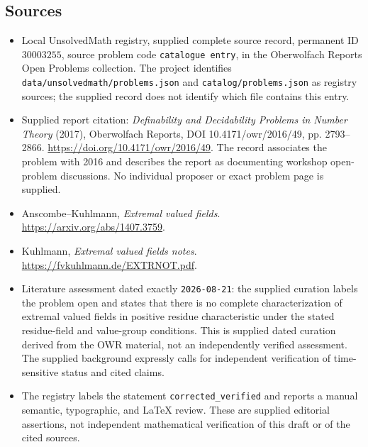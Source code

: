 \documentclass[11pt]{article}
\begin{document}
\subsection{Sources}
\begin{itemize}
\item Local UnsolvedMath registry, supplied complete source record, permanent ID \(30003255\), source problem code \texttt{catalogue entry}, in the Oberwolfach Reports Open Problems collection. The project identifies \texttt{data/unsolvedmath/problems.json} and \texttt{catalog/problems.json} as registry sources; the supplied record does not identify which file contains this entry.
\item Supplied report citation: \emph{Definability and Decidability Problems in Number Theory} (2017), Oberwolfach Reports, DOI 10.4171/owr/2016/49, pp. 2793--2866. \url{https://doi.org/10.4171/owr/2016/49}. The record associates the problem with 2016 and describes the report as documenting workshop open-problem discussions. No individual proposer or exact problem page is supplied.
\item Anscombe--Kuhlmann, \emph{Extremal valued fields}. \url{https://arxiv.org/abs/1407.3759}.
\item Kuhlmann, \emph{Extremal valued fields notes}. \url{https://fvkuhlmann.de/EXTRNOT.pdf}.
\item Literature assessment dated exactly \texttt{2026-08-21}: the supplied curation labels the problem open and states that there is no complete characterization of extremal valued fields in positive residue characteristic under the stated residue-field and value-group conditions. This is supplied dated curation derived from the OWR material, not an independently verified assessment. The supplied background expressly calls for independent verification of time-sensitive status and cited claims.
\item The registry labels the statement \texttt{corrected\_verified} and reports a manual semantic, typographic, and LaTeX review. These are supplied editorial assertions, not independent mathematical verification of this draft or of the cited sources.
\end{itemize}
\end{document}
